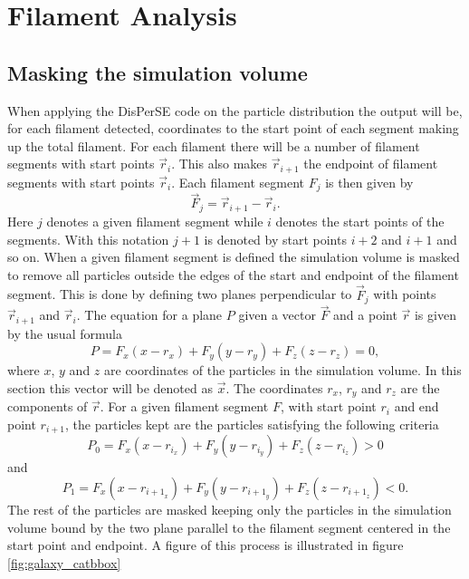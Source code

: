 \section{Filament Analysis}
\subsection{Masking the simulation volume}\label{sec:maskingfilament}
When applying the DisPerSE code on the particle distribution the output will be,
for each filament detected, coordinates to the start point of each segment
making up the total filament. For each filament there will be a number of
filament segments with start points $\vec{r}_i$. This also makes $\vec{r}_{i+1}$
the endpoint of filament segments with start points $\vec{r}_i$. Each filament segment $F_j$ is
then given by
\begin{equation}
    \vec{F}_{j}=\vec{r}_{i+1}-\vec{r}_i.
\end{equation}
Here $j$ denotes a given filament segment while $i$ denotes the start points of the
segments. With this notation $j+1$ is denoted by start points $i+2$ and $i+1$ and
so on. When a given filament segment is defined the simulation volume is masked
to remove all particles outside the edges of the start and endpoint of the
filament segment. This is done by defining  two planes perpendicular to
$\vec{F}_j$ with points $\vec{r}_{i+1}$ and $\vec{r}_i$. The equation for a
plane $P$ given a vector $\vec{F}$ and a point $\vec{r}$ is given
by the usual formula
\begin{equation}\label{eq:plane_mask}
    P=F_x(x-r_x)+F_y(y-r_y)+F_z(z-r_z)=0,
\end{equation}
where $x$, $y$ and $z$ are coordinates of the particles in the simulation
volume. In this section this vector will be denoted as $\vec{x}$.
The coordinates $r_x$, $r_y$ and $r_z$ are the components of $\vec{r}$.
For a given filament segment $F$, with start point $r_{i}$ and end point $r_{i+1}$, the particles kept are the particles
satisfying the following criteria
\begin{equation}
    P_0=F_x(x-r_{i_x})+F_y(y-r_{i_y})+F_z(z-r_{i_z})>0
\end{equation}
and
\begin{equation}
    P_1=F_x(x-r_{{i+1}_x})+F_y(y-r_{{i+1}_y})+F_z(z-r_{{i+1}_z})<0.
\end{equation}
The rest of the particles are masked keeping only the particles in the
simulation volume bound by the two plane parallel to the filament segment
centered in the start point and endpoint. A figure of this process is illustrated in figure \ref{fig:galaxy_catbbox}

